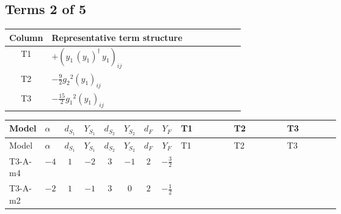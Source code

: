 \documentclass[8pt]{article}
\begin{document}
\begin{landscape}
\subsection*{Terms 2 of 5}
\begin{center}
\begin{tabular}{@{}c >{\raggedright\arraybackslash}p{0.82\linewidth}@{}}
\toprule
Column & Representative term structure \\
\midrule
T1 & \(\displaystyle +\left({y_1}\,\left({y_1}\right)^{\dagger}\,{y_1}\right)_{ij}\) \\
\midrule
T2 & \(\displaystyle -\frac{9}{2} {g_2}^2 \left({y_1}\right)_{ij}\) \\
\midrule
T3 & \(\displaystyle -\frac{15}{2} {g_1}^2 \left({y_1}\right)_{ij}\) \\
\midrule
\bottomrule
\end{tabular}
\end{center}
\smallskip
\tiny
\begin{longtable}{@{}llcccccc >{\raggedright\arraybackslash}p{0.21\linewidth} >{\raggedright\arraybackslash}p{0.21\linewidth} >{\raggedright\arraybackslash}p{0.21\linewidth}@{}}
\toprule
Model & $\alpha$ & $d_{S_1}$ & $Y_{S_1}$ & $d_{S_2}$ & $Y_{S_2}$ & $d_F$ & $Y_F$ & T1 & T2 & T3 \\
\midrule
\endfirsthead
\toprule
Model & $\alpha$ & $d_{S_1}$ & $Y_{S_1}$ & $d_{S_2}$ & $Y_{S_2}$ & $d_F$ & $Y_F$ & T1 & T2 & T3 \\
\midrule
\endhead
T3-A-m4 & $-4$ & $1$ & $-2$ & $3$ & $-1$ & $2$ & $-\frac{3}{2}$ & \scriptsize\adjustbox{max width=\linewidth}{$\begin{gathered} +\left({y_1}\,\left({y_1}\right)^{\dagger}\,{y_1}\right)_{ij}\end{gathered}$} & \scriptsize\adjustbox{max width=\linewidth}{$\begin{gathered} -\frac{9}{2} {g_2}^2 \left({y_1}\right)_{ij}\end{gathered}$} & \scriptsize\adjustbox{max width=\linewidth}{$\begin{gathered} -\frac{15}{2} {g_1}^2 \left({y_1}\right)_{ij}\end{gathered}$} \\
\midrule
T3-A-m2 & $-2$ & $1$ & $-1$ & $3$ & $0$ & $2$ & $-\frac{1}{2}$ & \scriptsize\adjustbox{max width=\linewidth}{$\begin{gathered} +\left({y_1}\,\left({y_1}\right)^{\dagger}\,{y_1}\right)_{ij}\end{gathered}$} & \scriptsize\adjustbox{max width=\linewidth}{$\begin{gathered} -\frac{9}{2} {g_2}^2 \left({y_1}\right)_{ij}\end{gathered}$} & \scriptsize\adjustbox{max width=\linewidth}{$\begin{gathered} -\frac{3}{2} {g_1}^2 \left({y_1}\right)_{ij}\end{gathered}$} \\

\end{longtable}
\end{landscape}
\end{document}
